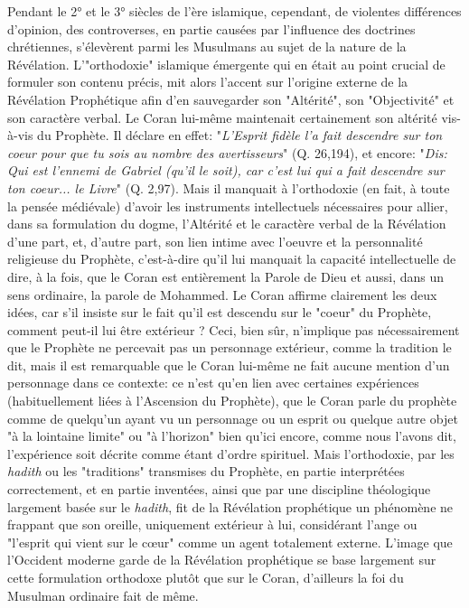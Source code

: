 Pendant le 2° et le 3° siècles de l'ère islamique, cependant, de
violentes différences d'opinion, des controverses, en partie causées par
l'influence des doctrines chrétiennes, s'élevèrent parmi les Musulmans
au sujet de la nature de la Révélation. L'"orthodoxie" islamique
émergente qui en était au point crucial de formuler son contenu précis,
mit alors l'accent sur l'origine externe de la Révélation Prophétique
afin d'en sauvegarder son "Altérité", son "Objectivité" et son caractère
verbal. Le Coran lui-même maintenait certainement son altérité vis-à-vis
du Prophète. Il déclare en effet: "\emph{L'Esprit fidèle l'a fait
descendre sur ton coeur pour que tu sois au nombre des avertisseurs}"
(Q. 26,194), et encore: "\emph{Dis: Qui est l'ennemi de Gabriel (qu'il
le soit), car c'est lui qui a fait descendre sur ton coeur... le Livre}"
(Q. 2,97). Mais il manquait à l'orthodoxie (en fait, à toute la pensée
médiévale) d'avoir les instruments intellectuels nécessaires pour
allier, dans sa formulation du dogme, l'Altérité et le caractère verbal
de la Révélation d'une part, et, d'autre part, son lien intime avec
l'oeuvre et la personnalité religieuse du Prophète, c'est-à-dire qu'il
lui manquait la capacité intellectuelle de dire, à la fois, que le Coran
est entièrement la Parole de Dieu et aussi, dans un sens ordinaire, la
parole de Mohammed. Le Coran affirme clairement les deux idées, car s'il
insiste sur le fait qu'il est descendu sur le "coeur" du Prophète,
comment peut-il lui être extérieur ? Ceci, bien sûr, n'implique pas
nécessairement que le Prophète ne percevait pas un personnage extérieur,
comme la tradition le dit, mais il est remarquable que le Coran lui-même
ne fait aucune mention d'un personnage dans ce contexte: ce n'est qu'en
lien avec certaines expériences (habituellement liées à l'Ascension du
Prophète), que le Coran parle du prophète comme de quelqu'un ayant vu un
personnage ou un esprit ou quelque autre objet "à la lointaine limite"
ou "à l'horizon" bien qu'ici encore, comme nous l'avons dit,
l'expérience soit décrite comme étant d'ordre spirituel. Mais
l'orthodoxie, par les \emph{hadith} ou les "traditions" transmises du
Prophète, en partie interprétées correctement, et en partie inventées,
ainsi que par une discipline théologique largement basée sur le
\emph{hadith}, fit de la Révélation prophétique un phénomène ne frappant
que son oreille, uniquement extérieur à lui, considérant l'ange ou
"l'esprit qui vient sur le cœur" comme un agent totalement externe.
L'image que l'Occident moderne garde de la Révélation prophétique se
base largement sur cette formulation orthodoxe plutôt que sur le Coran,
d'ailleurs la foi du Musulman ordinaire fait de même.


